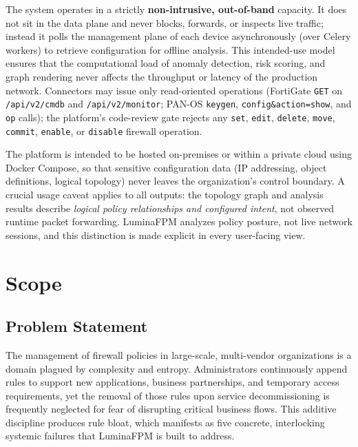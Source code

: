 The system operates in a strictly \textbf{non-intrusive, out-of-band} capacity. It does not sit in the data plane and never blocks, forwards, or inspects live traffic; instead it polls the management plane of each device asynchronously (over Celery workers) to retrieve configuration for offline analysis. This intended-use model ensures that the computational load of anomaly detection, risk scoring, and graph rendering never affects the throughput or latency of the production network. Connectors may issue only read-oriented operations (FortiGate \texttt{GET} on \texttt{/api/v2/cmdb} and \texttt{/api/v2/monitor}; PAN-OS \texttt{keygen}, \texttt{config\&action=show}, and \texttt{op} calls); the platform's code-review gate rejects any \texttt{set}, \texttt{edit}, \texttt{delete}, \texttt{move}, \texttt{commit}, \texttt{enable}, or \texttt{disable} firewall operation.

The platform is intended to be hosted on-premises or within a private cloud using Docker Compose, so that sensitive configuration data (IP addressing, object definitions, logical topology) never leaves the organization's control boundary. A crucial usage caveat applies to all outputs: the topology graph and analysis results describe \emph{logical policy relationships and configured intent}, not observed runtime packet forwarding. LuminaFPM analyzes policy posture, not live network sessions, and this distinction is made explicit in every user-facing view.

\section{Scope}
\label{sec:ch1-scope}

\subsection{Problem Statement}
\label{sec:ch1-problem}

The management of firewall policies in large-scale, multi-vendor organizations is a domain plagued by complexity and entropy. Administrators continuously append rules to support new applications, business partnerships, and temporary access requirements, yet the removal of those rules upon service decommissioning is frequently neglected for fear of disrupting critical business flows. This additive discipline produces rule bloat, which manifests as five concrete, interlocking systemic failures that LuminaFPM is built to address.

